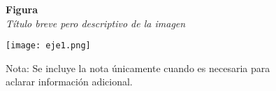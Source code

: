 \documentclass[12pt,letterpaper]{report}
\begin{document}
	\begin{figure}[ht]
		
		\textbf{Figura \thefigure}\\[0.5em]
		\textit{Título breve pero descriptivo de la imagen}\\[1em]
		\begin{center}
			
			\texttt{[image: eje1.png]}\\[1em]
		\end{center}
		
		
		\normalsize Nota: Se incluye la nota únicamente cuando es necesaria para aclarar información adicional.
				
	\end{figure}
	
\end{document}
